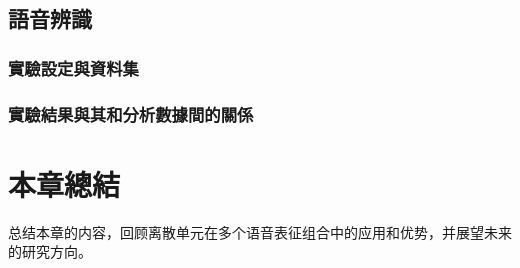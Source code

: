 \subsection{語音辨識}

\subsubsection{實驗設定與資料集}

\subsubsection{實驗結果與其和分析數據間的關係}



\section{本章總結}

总结本章的内容，回顾离散单元在多个语音表征组合中的应用和优势，并展望未来的研究方向。
